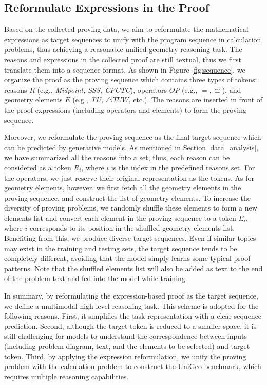 \documentclass[11pt]{article}
\begin{document}
\subsection{Reformulate Expressions in the Proof}

Based on the collected proving data, we aim to reformulate the mathematical expressions as target sequences to unify with the program sequence in calculation problems, thus achieving a reasonable unified geometry reasoning task.
The reasons and expressions in the collected proof are still textual, thus we first translate them into a sequence format.
As shown in Figure \ref{fig:sequence}, we organize the proof as the proving sequence which contains three types of tokens: reasons $R$ (e.g., \textit{Midpoint, SSS, CPCTC}), operators $OP$ (e.g., $=, \cong$), and geometry elements $E$ (e.g., \textit{TU, $\triangle TUW$}, etc.).
The reasons are inserted in front of the proof expressions (including operators and elements) to form the proving sequence.

Moreover, we reformulate the proving sequence as the final target sequence which can be predicted by generative models.
As mentioned in Section \ref{data_analysis}, we have summarized all the reasons into a set, thus, each reason can be considered as a token $R_i$, where $i$ is the index in the predefined reasons set. For the operators, we just reserve their original representation as the tokens.
As for geometry elements, however, we first fetch all the geometry elements in the proving sequence, and construct the list of geometry elements.
To increase the diversity of proving problems, we randomly shuffle these elements to form a new elements list and convert each element in the proving sequence to a token  $E_i$, where $i$ corresponds to its position in the shuffled geometry elements list.
Benefiting from this, we produce diverse target sequences. Even if similar topics may exist in the training and testing sets, the target sequence tends to be completely different, avoiding that the model simply learns some typical proof patterns.
Note that the shuffled elements list will also be added as text to the end of the problem text and fed into the model while training.


In summary, by reformulating the expression-based proof as the target sequence, we define a multimodal high-level reasoning task.
This scheme is adopted for the following reasons.
First, it simplifies the task representation with a clear sequence prediction. 
Second, although the target token is reduced to a smaller space, it is still challenging for models to understand the correspondence between inputs (including problem diagram, text, and the elements to be selected) and target token.
Third, by applying the expression reformulation, we unify the proving problem with the calculation problem to construct the UniGeo benchmark, which requires multiple reasoning capabilities.
\end{document}
